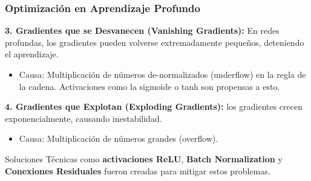 \documentclass[aspectratio=169, 10pt]{beamer}
\begin{document}
\begin{frame}
	\frametitle{Optimización en Aprendizaje Profundo}
	
	
		
			\textbf{3. Gradientes que se Desvanecen (Vanishing Gradients):} En redes profundas, los gradientes pueden volverse extremadamente pequeños, deteniendo el aprendizaje.
			\begin{itemize}
				\item \small Causa: Multiplicación de números de-normalizados (underflow) en la regla de la cadena. Activaciones como la sigmoide o tanh son propensas a esto.
			\end{itemize}
			
			\vspace{0.5cm}
			
			\textbf{4. Gradientes que Explotan (Exploding Gradients):} los gradientes crecen exponencialmente, causando inestabilidad.
			\begin{itemize}
				\item \small Causa: Multiplicación de números grandes (overflow).
			\end{itemize}
			
			\vfill
			\begin{block}{Soluciones}
				Técnicas como \textbf{activaciones ReLU}, \textbf{Batch Normalization} y \textbf{Conexiones Residuales}  fueron creadas para mitigar estos problemas.
			\end{block}
\end{frame}
\end{document}
